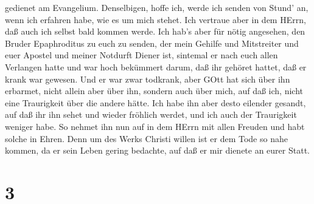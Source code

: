 gedienet am Evangelium.  Denselbigen, hoffe ich, werde ich
senden von Stund' an, wenn ich erfahren habe, wie es um mich stehet.
 Ich vertraue aber in dem HErrn, daß auch ich selbst bald
kommen werde.  Ich hab's aber für nötig angesehen, den
Bruder Epaphroditus zu euch zu senden, der mein Gehilfe und Mitstreiter
und euer Apostel und meiner Notdurft Diener ist,  sintemal
er nach euch allen Verlangen hatte und war hoch bekümmert darum, daß ihr
gehöret hattet, daß er krank war gewesen.  Und er war zwar
todkrank, aber GOtt hat sich über ihn erbarmet, nicht allein aber über
ihn, sondern auch über mich, auf daß ich, nicht eine Traurigkeit über
die andere hätte.  Ich habe ihn aber desto eilender
gesandt, auf daß ihr ihn sehet und wieder fröhlich werdet, und ich auch
der Traurigkeit weniger habe.  So nehmet ihn nun auf in dem
HErrn mit allen Freuden und habt solche in Ehren.  Denn um
des Werks Christi willen ist er dem Tode so nahe kommen, da er sein
Leben gering bedachte, auf daß er mir dienete an eurer Statt.

\hypertarget{section-2}{%
\section{3}\label{section-2}}

